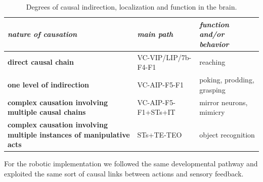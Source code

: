 \begin{table}[htbp]
\begin{center}
\begin{tabular}{|p{3.5cm}|p{2.5cm}|p{4.5cm}|}
\hline
{\it nature of causation} & {\it main path} &  {\it function and/or behavior} \\ \hline\hline
{\bf direct causal chain} & VC-VIP/LIP/7b-F4-F1 & reaching\\ \hline
{\bf one level of indirection} & VC-AIP-F5-F1 & poking, prodding, grasping\\ \hline
{\bf complex causation involving multiple causal chains} & VC-AIP-F5-F1+STs+IT & mirror neurons, mimicry\\ \hline
{\bf complex causation involving multiple instances of manipulative acts} & STs+TE-TEO & object recognition\\ \hline
\end{tabular}
\caption{
\label{tab:circuits}
%
Degrees of causal indirection, localization and function in the brain.
%
}
\end{center}
\end{table}

For the robotic implementation we followed the same developmental
pathway and exploited the same sort of causal links between actions and 
sensory feedback.

